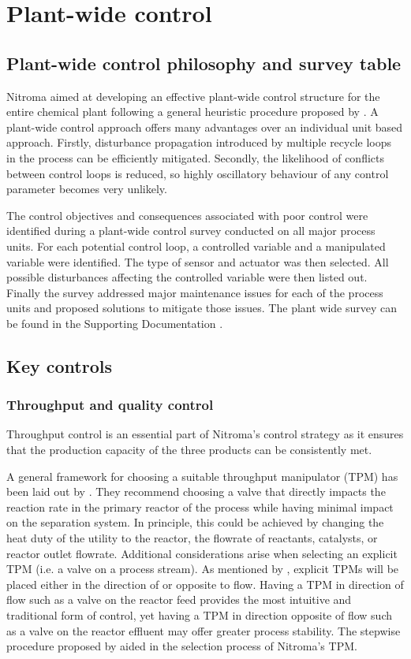 \section{Plant-wide control}


\subsection{Plant-wide control philosophy and survey table}%

Nitroma aimed at developing an effective plant-wide control structure for the entire chemical plant following a general heuristic procedure proposed by \textcite{}. A plant-wide control approach offers many advantages over an individual unit based approach. Firstly, disturbance propagation introduced by multiple recycle loops in the process can be efficiently mitigated. Secondly, the likelihood of conflicts between control loops is reduced, so highly oscillatory behaviour of any control parameter becomes very unlikely. 

The control objectives and consequences associated with poor control were identified during a plant-wide control survey conducted on all major process units. For each potential control loop, a controlled variable and a manipulated variable were identified. The type of sensor and actuator was then selected. All possible disturbances affecting the controlled variable were then listed out. Finally the survey addressed major maintenance issues for each of the process units and proposed solutions to mitigate those issues. The plant wide survey can be found in the Supporting Documentation .


\subsection{Key controls}%

\subsubsection{Throughput and quality control}
Throughput control is an essential part of Nitroma's control strategy as it ensures that the production capacity of the three products can be consistently met. 

A general framework for choosing a suitable throughput manipulator (TPM) has been laid out by \textcite{}. They recommend choosing a valve that directly impacts the reaction rate in the primary reactor of the process while having minimal impact on the separation system. In principle, this could be achieved by changing the heat duty of the utility to the reactor, the flowrate of reactants, catalysts, or reactor outlet flowrate. Additional considerations arise when selecting an explicit TPM (i.e. a valve on a process stream). As mentioned by \textcite{}, explicit TPMs will be placed either in the direction of or opposite to flow. Having a TPM in direction of flow such as a valve on the reactor feed provides the most intuitive and traditional form of control, yet having a TPM in direction opposite of flow such as a valve on the reactor effluent may offer greater process stability. The stepwise procedure proposed by \textcite{} aided in the selection process of Nitroma's TPM. 

